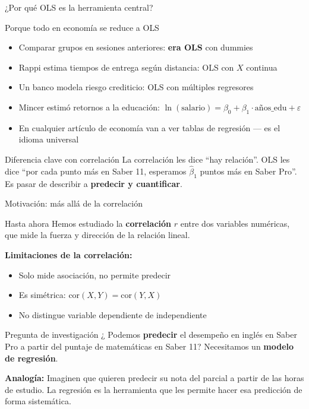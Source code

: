 \documentclass[aspectratio=169, 11pt]{beamer}
\begin{document}
\begin{frame}{¿Por qué OLS es la herramienta central?}
\begin{exampleblock}{Porque todo en economía se reduce a OLS}
\small
\begin{itemize}\setlength{\itemsep}{2pt}
  \item Comparar grupos en sesiones anteriores: \textbf{era OLS} con dummies
  \item Rappi estima tiempos de entrega según distancia: OLS con $X$ continua
  \item Un banco modela riesgo crediticio: OLS con múltiples regresores
  \item Mincer estimó retornos a la educación: $\ln(\text{salario}) = \beta_0 + \beta_1 \cdot \text{años\_edu} + \varepsilon$
  \item En cualquier artículo de economía van a ver tablas de regresión --- es el idioma universal
\end{itemize}
\end{exampleblock}

\begin{alertblock}{Diferencia clave con correlación}
\small
La correlación les dice ``hay relación''. OLS les dice ``por cada punto más en Saber 11, esperamos $\hat{\beta}_1$ puntos más en Saber Pro''. Es pasar de describir a \textbf{predecir y cuantificar}.
\end{alertblock}
\end{frame}

\begin{frame}{Motivación: más allá de la correlación}
\begin{block}{Hasta ahora}
Hemos estudiado la \textbf{correlación} $r$ entre dos variables numéricas, que mide la fuerza y dirección de la relación lineal.
\end{block}

\vspace{0.1cm}
\textbf{Limitaciones de la correlación:}
\begin{itemize}
  \item Solo mide asociación, no permite predecir
  \item Es simétrica: $\text{cor}(X,Y) = \text{cor}(Y,X)$
  \item No distingue variable dependiente de independiente
\end{itemize}

\vspace{0.1cm}
\begin{exampleblock}{Pregunta de investigación}
\small ¿ Podemos \textbf{predecir} el desempeño en inglés en Saber Pro a partir del puntaje de matemáticas en Saber 11? Necesitamos un \textbf{modelo de regresión}.

\smallskip
\textbf{Analogía:} Imaginen que quieren predecir su nota del parcial a partir de las horas de estudio. La regresión es la herramienta que les permite hacer esa predicción de forma sistemática.
\end{exampleblock}
\end{frame}
\end{document}
